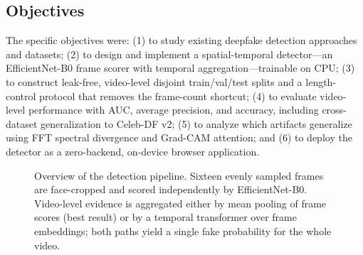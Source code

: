 \documentclass[conference]{IEEEtran}
\begin{document}
\subsection{Objectives}
The specific objectives were: (1) to study existing deepfake detection approaches and datasets; (2) to design and implement a spatial-temporal detector---an EfficientNet-B0 frame scorer with temporal aggregation---trainable on CPU; (3) to construct leak-free, video-level disjoint train/val/test splits and a length-control protocol that removes the frame-count shortcut; (4) to evaluate video-level performance with AUC, average precision, and accuracy, including cross-dataset generalization to Celeb-DF v2; (5) to analyze which artifacts generalize using FFT spectral divergence and Grad-CAM attention; and (6) to deploy the detector as a zero-backend, on-device browser application.

\begin{figure}[t]
\centering
{}
\caption{Overview of the detection pipeline. Sixteen evenly sampled frames are face-cropped and scored independently by EfficientNet-B0. Video-level evidence is aggregated either by mean pooling of frame scores (best result) or by a temporal transformer over frame embeddings; both paths yield a single fake probability for the whole video.}
\label{fig:pipeline}
\end{figure}
\end{document}
